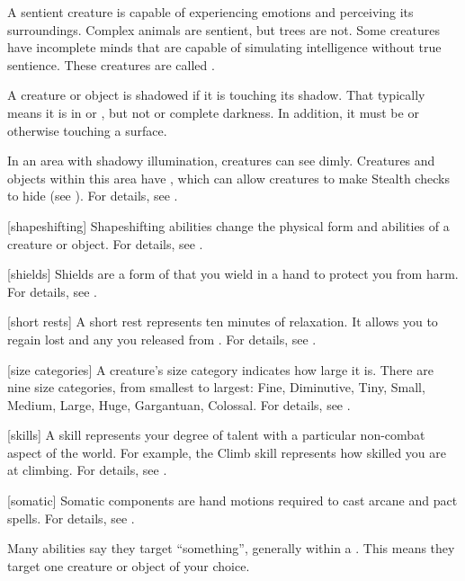 A sentient creature is capable of experiencing emotions and perceiving its surroundings.
Complex animals are sentient, but trees are not.
Some creatures have incomplete minds that are capable of simulating intelligence without true sentience.
These creatures are called .

 A creature or object is shadowed if it is touching its shadow.
That typically means it is in  or , but not  or complete darkness.
In addition, it must be  or otherwise touching a surface.

 In an area with shadowy illumination, creatures can see dimly.
Creatures and objects within this area have , which can allow creatures to make Stealth checks to hide (see ).
For details, see .

[shapeshifting] Shapeshifting abilities change the physical form and abilities of a creature or object.
For details, see .

[shields] Shields are a form of  that you wield in a hand to protect you from harm.
For details, see .

[short rests] A short rest represents ten minutes of relaxation.
It allows you to regain lost  and any  you released from .
For details, see .

[size categories] A creature's size category indicates how large it is.
There are nine size categories, from smallest to largest: Fine, Diminutive, Tiny, Small, Medium, Large, Huge, Gargantuan, Colossal.
For details, see .

[skills] A skill represents your degree of talent with a particular non-combat aspect of the world.
For example, the Climb skill represents how skilled you are at climbing.
For details, see .

[somatic] Somatic components are hand motions required to cast arcane and pact spells.
For details, see .

 Many abilities say they target ``something'', generally within a .
This means they target one creature or object of your choice.

